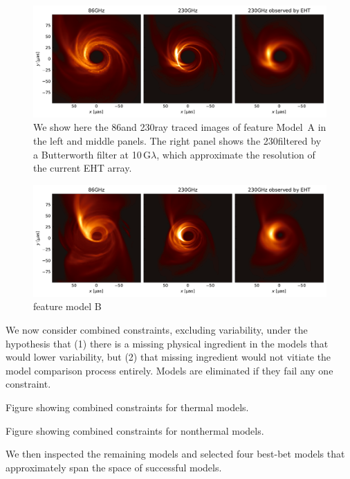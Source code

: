 
\begin{figure}
  \centering
  \includegraphics[width=\textwidth]{figures/bestbet_A.pdf}
  \caption{We show here the 86\GHz and 230\GHz ray traced images of
    feature Model~A in the left and middle panels.
    The right panel shows the 230\GHz filtered by a Butterworth filter
    at 10$\,\mathrm{G}\lambda$, which approximate the resolution of
    the current EHT array.}
  \label{fig:bestbet_A}
\end{figure}

\begin{figure}
  \centering
  \includegraphics[width=\textwidth]{figures/bestbet_B.pdf}
  \caption{feature model B}
  \label{fig:bestbet_B}
\end{figure}

We now consider combined constraints, excluding variability, under the
hypothesis that (1) there is a missing physical ingredient in the
models that would lower variability, but (2) that missing ingredient
would not vitiate the model comparison process entirely.
Models are eliminated if they fail any one constraint.

\citep{2020arXiv200406210P}

Figure showing combined constraints for thermal models.

Figure showing combined constraints for nonthermal models.

We then inspected the remaining models and selected four best-bet
models that approximately span the space of successful models.

